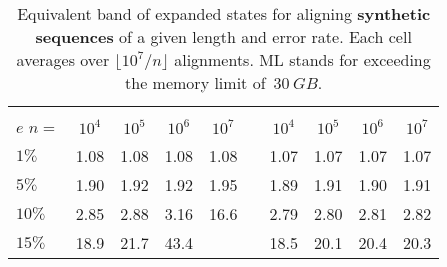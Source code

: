\begin{table}[H]
  \centering
  \sffamily
  \setlength{\tabcolsep}{3pt}
  \begin{tabular}{lSSSSlSSSS}
    &  &  &  \\
     
    $e$ \quad $n=$\hspace{-0.5em} & {$10^4$} & {$10^5$} & {$10^6$} & {$10^7$}  && {$10^4$} & {$10^5$} & {$10^6$} & {$10^7$} \\
    $1\%$ & 1.08 & 1.08 & 1.08 & 1.08 &
    & 1.07 & 1.07 & 1.07 & 1.07 \\
    $5\%$ & 1.90 & 1.92 & 1.92 & 1.95 &
    & 1.89 & 1.91 & 1.90 & 1.91 \\
    $10\%$ & 2.85 & 2.88 & 3.16 & 16.6 &
    & 2.79 & 2.80 & 2.81 & 2.82 \\
    $15\%$ & 18.9 & 21.7 & 43.4 &  &
    & 18.5 & 20.1 & 20.4 & 20.3 \\
  \end{tabular}
  \caption[Equivalent band of expanded states for the (chaining) seed heuristic
           (various sequence lengths and error rates)]{Equivalent band of
           expanded states for aligning \textbf{synthetic sequences} of a given
           length and error rate. Each cell averages over $\lfloor
           10^7/n\rfloor$ alignments. ML stands for exceeding the memory limit
           of~$\qty{30}{GB}$.}
  \label{GLOBALtab:band}
\end{table}
